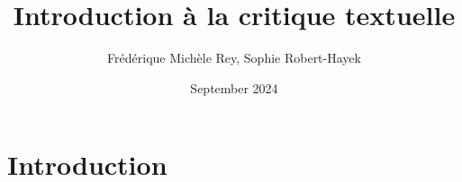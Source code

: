 \documentclass[11pt,a4paper]{article}
\title{Introduction à la critique textuelle}
\author{Frédérique Michèle Rey, Sophie Robert-Hayek}
\date{September 2024}
\begin{document}
\maketitle
\justifying

\section{Introduction}
\end{document}
